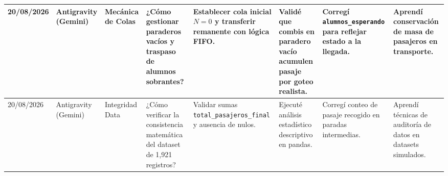 \begin{landscape}
\begin{center}
\begin{tabularx}{\linewidth}{p{1.3cm} p{1.6cm} p{1.6cm} X X X X X}
		\midrule
		20/08/2026 & Antigravity (Gemini) & Mecánica de Colas & ¿Cómo gestionar paraderos vacíos y traspaso de alumnos sobrantes? & Establecer cola inicial $N=0$ y transferir remanente con lógica FIFO. & Validé que combis en paradero vacío acumulen pasaje por goteo realista. & Corregí \texttt{alumnos\_esperando} para reflejar estado a la llegada. & Aprendí conservación de masa de pasajeros en transporte. \\
		\midrule
		20/08/2026 & Antigravity (Gemini) & Integridad Data & ¿Cómo verificar la consistencia matemática del dataset de 1,921 registros? & Validar sumas \texttt{total\_pasajeros\_final} y ausencia de nulos. & Ejecuté análisis estadístico descriptivo en pandas. & Corregí conteo de pasaje recogido en paradas intermedias. & Aprendí técnicas de auditoría de datos en datasets simulados. \\
		\bottomrule
	\end{tabularx}
\end{center}
\end{landscape}


